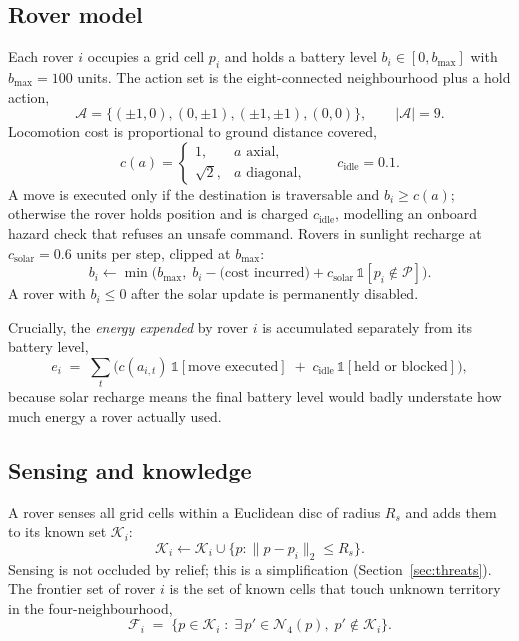 \documentclass[11pt]{article}
\begin{document}
\subsection{Rover model}

Each rover $i$ occupies a grid cell $p_i$ and holds a battery level
$b_i \in [0, b_{\max}]$ with $b_{\max} = 100$ units. The action set is the
eight-connected neighbourhood plus a hold action,
\begin{equation}
\mathcal{A} = \{(\pm 1, 0), (0, \pm 1), (\pm 1, \pm 1), (0,0)\}, \qquad |\mathcal{A}| = 9 .
\end{equation}
Locomotion cost is proportional to ground distance covered,
\begin{equation}
c(a) =
\begin{cases}
1, & a \text{ axial}, \\
\sqrt{2}, & a \text{ diagonal},
\end{cases}
\qquad c_{\text{idle}} = 0.1 .
\end{equation}
A move is executed only if the destination is traversable and
$b_i \ge c(a)$; otherwise the rover holds position and is charged
$c_{\text{idle}}$, modelling an onboard hazard check that refuses an unsafe
command. Rovers in sunlight recharge at $c_{\text{solar}} = 0.6$ units per step,
clipped at $b_{\max}$:
\begin{equation}
b_i \leftarrow \min\!\big(b_{\max},\; b_i - \text{(cost incurred)} + c_{\text{solar}}\,\mathbb{1}[p_i \notin \mathcal{P}]\big).
\end{equation}
A rover with $b_i \le 0$ after the solar update is permanently disabled.

Crucially, the \emph{energy expended} by rover $i$ is accumulated separately
from its battery level,
\begin{equation}
e_i \;=\; \sum_{t} \Big( c(a_{i,t})\,\mathbb{1}[\text{move executed}] \;+\; c_{\text{idle}}\,\mathbb{1}[\text{held or blocked}] \Big),
\label{eq:energy}
\end{equation}
because solar recharge means the final battery level would badly understate how
much energy a rover actually used.

\subsection{Sensing and knowledge}

A rover senses all grid cells within a Euclidean disc of radius $R_s$ and adds
them to its known set $\mathcal{K}_i$:
\begin{equation}
\mathcal{K}_i \leftarrow \mathcal{K}_i \cup \{ p : \lVert p - p_i \rVert_2 \le R_s \}.
\end{equation}
Sensing is not occluded by relief; this is a simplification
(Section~\ref{sec:threats}). The frontier set of rover $i$ is the set of known
cells that touch unknown territory in the four-neighbourhood,
\begin{equation}
\mathcal{F}_i \;=\; \big\{ p \in \mathcal{K}_i \;:\; \exists\, p' \in \mathcal{N}_4(p),\; p' \notin \mathcal{K}_i \big\}.
\end{equation}
\end{document}
